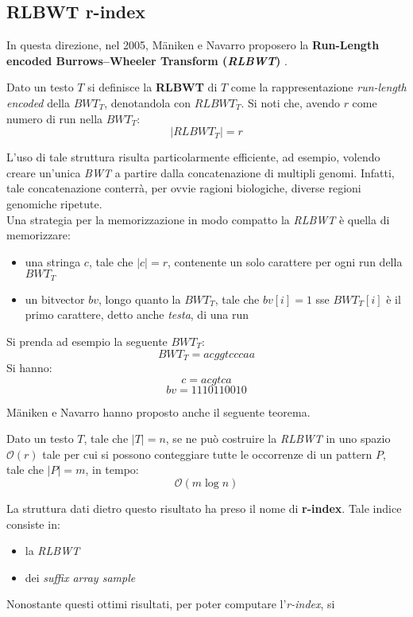\subsection{RLBWT r-index}
In questa direzione, nel 2005, M\"{a}niken e Navarro proposero la
\textbf{Run-Length encoded Burrows–Wheeler Transform (\textit{RLBWT})}
\cite{rlbwt}.
\begin{definizione}
  Dato un testo $T$ si definisce la \textbf{RLBWT} di $T$
  come la rappresentazione \textit{run-length encoded} della $BWT_T$,
  denotandola con $RLBWT_T$. Si noti che, avendo $r$ come numero di run nella
  $BWT_T$: 
  \[|RLBWT_T|=r\]
\end{definizione}
L'uso di tale
struttura risulta particolarmente efficiente, ad esempio, volendo creare
un'unica \textit{BWT} a partire dalla concatenazione di multipli
genomi. Infatti, tale
concatenazione conterrà, per ovvie ragioni biologiche, diverse regioni genomiche
ripetute. \\
Una strategia per la memorizzazione in modo compatto la \textit{RLBWT} è quella
di memorizzare: 
\begin{itemize}
  \item una stringa $c$, tale che $|c|=r$, contenente un solo carattere per ogni
  run della $BWT_T$
  \item un bitvector $bv$, longo quanto la $BWT_T$, tale che $bv[i]=1$ sse
  $BWT_T[i]$ è il primo carattere, detto anche \textit{testa}, di una run 
\end{itemize}
\begin{esempio}
  Si prenda ad esempio la seguente $BWT_T$:
  \[BWT_T=acggtcccaa\]
  Si hanno:
  \[c=acgtca\]
  \[bv=1110110010\]
\end{esempio}
M\"{a}niken e Navarro hanno proposto anche il seguente teorema.
\begin{teorema}
  Dato un testo $T$, tale che $|T|=n$, se ne può costruire la \textit{RLBWT} in
  uno spazio $\mathcal{O}(r)$ tale per cui si possono conteggiare tutte le
  occorrenze di un pattern $P$, tale che $|P|=m$, in tempo:
  \[\mathcal{O}(m\log n)\]
\end{teorema}
\noindent
La struttura dati dietro questo risultato ha preso il nome di \textbf{r-index}.
Tale indice consiste in: 
\begin{itemize}
  \item la \textit{RLBWT}
  \item dei \textit{suffix array sample}
\end{itemize}
Nonostante questi ottimi risultati, per poter computare l'\textit{r-index}, si
